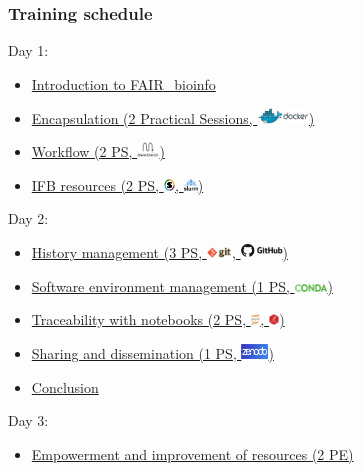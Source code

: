 \documentclass{beamer}
\newcommand\FAIRB{FAIR{\_}bioinfo}
\begin{document}
\begin{frame}
\frametitle{Training schedule}
Day 1:
\begin{itemize}
    \item \hyperlink{Introduction}{Introduction to \FAIRB}
    \item \hyperlink{Encapsulation}{Encapsulation (2 Practical Sessions, \includegraphics[height=0.4cm]{shared/logo-docker-paysage.png})}
    \item \hyperlink{Workflow}{Workflow (2 PS, \includegraphics[height=0.4cm]{shared/logo-snakemake.png})}
    \item \hyperlink{IFB}{IFB resources (2 PS, \includegraphics[height=0.3cm]{shared/logo-singularity.png}, \includegraphics[height=0.3cm]{shared/logo-slurm.png})}
\end{itemize}
Day 2:
\begin{itemize}
    \item \hyperlink{History_management}{History management (3 PS, \includegraphics[height=0.3cm]{shared/logo-git.png}, \includegraphics[height=0.4cm]{shared/logo-github.png})}
    \item \hyperlink{Software_environment}{Software environment management (1 PS, \includegraphics[height=0.2cm]{shared/logo-conda.png})}
    \item \hyperlink{Notebooks}{Traceability with notebooks (2 PS, \includegraphics[height=0.3cm]{shared/logo-jupyter.png}, \includegraphics[height=0.3cm]{shared/logo-Rmarkdown.png})}
    \item \hyperlink{Sharing}{Sharing and dissemination (1 PS, \includegraphics[height=0.4cm]{shared/logo-zenodo.png})}
    \item \hyperlink{Conclusion}{Conclusion}
\end{itemize}
Day 3: 
\begin{itemize}
    \item \hyperlink{Improvement}{Empowerment and improvement of resources (2 PE)}
\end{itemize}
\end{frame}
\end{document}
